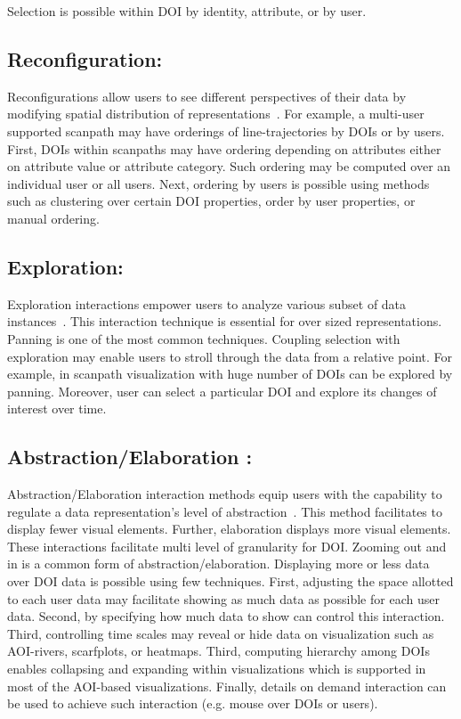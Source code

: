 Selection is possible within DOI by identity, attribute, or by user.
	
	
\subsection{Reconfiguration:} Reconfigurations allow users to see different perspectives of their data by modifying spatial distribution of representations~\cite{yi2007toward}. For example, a multi-user supported scanpath may have orderings of line-trajectories by DOIs or by users. First, DOIs within scanpaths may have ordering depending on attributes either on attribute value or attribute category. Such ordering may be computed over an individual user or all users. Next, ordering by users is possible using methods such as clustering over certain DOI properties, order by user properties, or manual ordering.

\subsection{Exploration:} Exploration interactions empower users to analyze various subset of data instances~\cite{yi2007toward}. This interaction technique is essential for over sized representations. Panning is one of the most common techniques. Coupling selection with exploration may enable users to stroll through the data from a relative point. For example, in scanpath visualization with huge number of DOIs can be explored by panning. Moreover, user can select a particular DOI and explore its changes of interest over time. 
	
\subsection{Abstraction/Elaboration :} Abstraction/Elaboration interaction methods equip users with the capability to regulate a data representation's level of abstraction~\cite{yi2007toward}. This method facilitates to display fewer visual elements. Further, elaboration displays more visual elements. These interactions facilitate multi level of granularity for DOI. Zooming out and in is a common form of abstraction/elaboration. Displaying more or less data over DOI data is possible using few techniques. First, adjusting the space allotted to each user data may facilitate showing as much data as possible for each user data. Second, by specifying how much data to show can control this interaction. Third, controlling time scales may reveal or hide data on visualization such as AOI-rivers, scarfplots, or  heatmaps. Third, computing hierarchy among DOIs enables collapsing and expanding within visualizations which is supported in most of the AOI-based visualizations. Finally, details on demand interaction can be used to achieve such interaction (e.g. mouse over DOIs or users).
	
